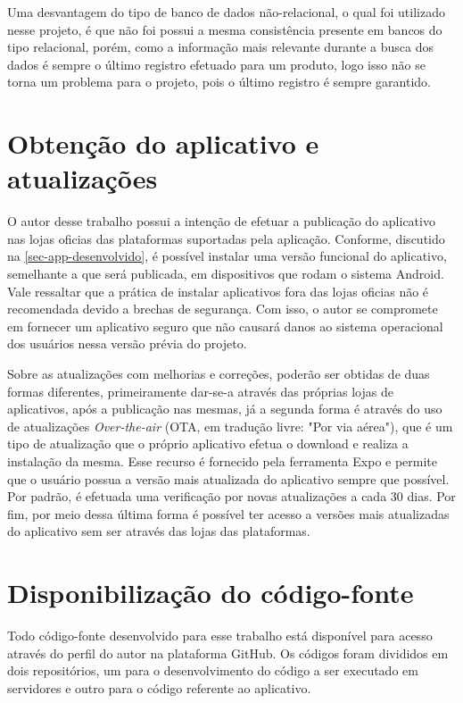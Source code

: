 Uma desvantagem do tipo de banco de dados não-relacional, o qual foi utilizado nesse projeto, é que não foi possui a mesma consistência presente em bancos do tipo relacional, porém, como a informação mais relevante durante a busca dos dados é sempre o último registro efetuado para um produto, logo isso não se torna um problema para o projeto, pois o último registro é sempre garantido.

\section{Obtenção do aplicativo e atualizações}

O autor desse trabalho possui a intenção de efetuar a publicação do aplicativo nas lojas oficias das plataformas suportadas pela aplicação. Conforme, discutido na \autoref{sec-app-desenvolvido}, é possível instalar uma versão funcional do aplicativo, semelhante a que será publicada, em dispositivos que rodam o sistema Android. Vale ressaltar que a prática de instalar aplicativos fora das lojas oficias não é recomendada devido a brechas de segurança. Com isso, o autor se compromete em fornecer um aplicativo seguro que não causará danos ao sistema operacional dos usuários nessa versão prévia do projeto.

Sobre as atualizações com melhorias e correções, poderão ser obtidas de duas formas diferentes, primeiramente dar-se-a através das próprias lojas de aplicativos, após a publicação nas mesmas, já a segunda forma é através do uso de atualizações \textit{Over-the-air} (OTA, em tradução livre: "Por via aérea"), que é um tipo de atualização que o próprio aplicativo efetua o download e realiza a instalação da mesma. Esse recurso é fornecido pela ferramenta Expo e permite que o usuário possua a versão mais atualizada do aplicativo sempre que possível. Por padrão, é efetuada uma verificação por novas atualizações a cada 30 dias. Por fim, por meio dessa última forma é possível ter acesso a versões mais atualizadas do aplicativo sem ser através das lojas das plataformas.

\section{Disponibilização do código-fonte}

Todo código-fonte desenvolvido para esse trabalho está disponível para acesso através do perfil do autor na plataforma GitHub. Os códigos foram divididos em dois repositórios, um para o desenvolvimento do código a ser executado em servidores e outro para o código referente ao aplicativo.

